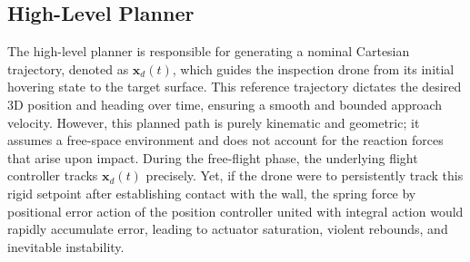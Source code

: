 \subsection{High-Level Planner}
The high-level planner is responsible for generating a nominal Cartesian trajectory, denoted as $\mathbf{x}_d(t)$, which guides the inspection drone from its initial hovering state to the target surface. This reference trajectory dictates the desired 3D position and heading over time, ensuring a smooth and bounded approach velocity. However, this planned path is purely kinematic and geometric; it assumes a free-space environment and does not account for the reaction forces that arise upon impact. During the free-flight phase, the underlying flight controller tracks $\mathbf{x}_d(t)$ precisely. Yet, if the drone were to persistently track this rigid setpoint after establishing contact with the wall, the spring force by positional error action of the position controller united with integral action would rapidly accumulate error, leading to actuator saturation, violent rebounds, and inevitable instability.

